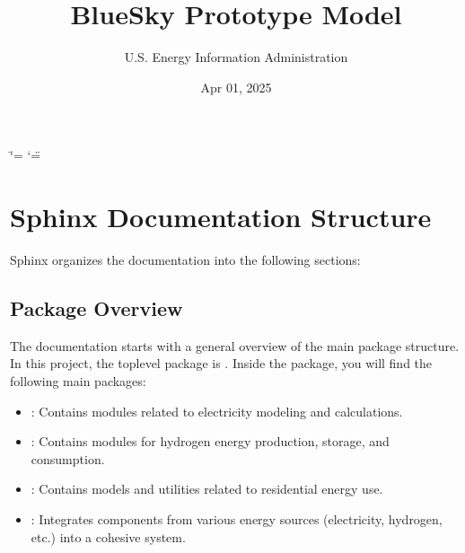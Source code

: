 \documentclass[letterpaper,10pt,english]{sphinxmanual}
\title{BlueSky Prototype Model}
\date{Apr 01, 2025}
\author{U.S.\@{} Energy Information Administration}
\begin{document}
\ifdefined\shorthandoff
  \ifnum\catcode`\=\string=\active\shorthandoff{=}\fi
  \ifnum\catcode`\"=\active{}\fi
\fi

\pagestyle{empty}
\sphinxmaketitle
\pagestyle{plain}
\sphinxtableofcontents
\pagestyle{normal}
\label{\detokenize{index::doc}}



\chapter{Sphinx Documentation Structure}
\label{\detokenize{index:sphinx-documentation-structure}}
\sphinxAtStartPar
Sphinx organizes the documentation into the following sections:


\section{Package Overview}
\label{\detokenize{index:package-overview}}
\sphinxAtStartPar
The documentation starts with a general overview of the main package structure. In this project, the top\sphinxhyphen{}level package is . Inside the  package, you will find the following main packages:
\begin{itemize}
\item {} 
\sphinxAtStartPar
{}: Contains modules related to electricity modeling and calculations.

\item {} 
\sphinxAtStartPar
{}: Contains modules for hydrogen energy production, storage, and consumption.

\item {} 
\sphinxAtStartPar
{}: Contains models and utilities related to residential energy use.

\item {} 
\sphinxAtStartPar
{}: Integrates components from various energy sources (electricity, hydrogen, etc.) into a cohesive system.

\end{itemize}
\end{document}

